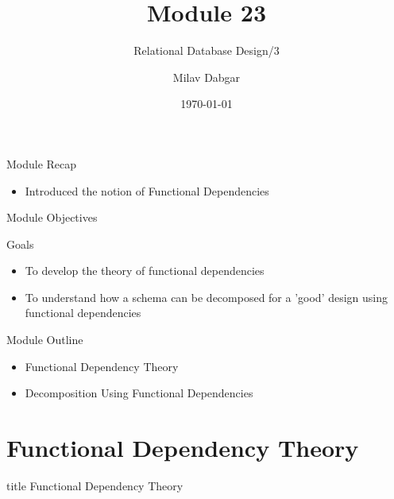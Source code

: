 \documentclass[aspectratio=169, xcolor=dvipsnames]{beamer}
\title{Module 23}
\subtitle{Relational Database Design/3}
\author{Milav Dabgar}
\institute{www.milav.in}
\date{\today}
\begin{document}
\begin{frame}
    \titlepage
\end{frame}

\begin{frame}{Module Recap}
    \begin{itemize}[<+->]
        \item Introduced the notion of Functional Dependencies
    \end{itemize}
\end{frame}

\begin{frame}{Module Objectives}
    \begin{block}{Goals}
        \begin{itemize}[<+->]
            \item To develop the theory of functional dependencies
            \item To understand how a schema can be decomposed for a 'good' design using functional dependencies
        \end{itemize}
    \end{block}
\end{frame}

\begin{frame}{Module Outline}
    \begin{itemize}[<+->]
        \item Functional Dependency Theory
        \item Decomposition Using Functional Dependencies
    \end{itemize}
\end{frame}

\section{Functional Dependency Theory}
\begin{frame}
  \vfill
  \centering
  \begin{beamercolorbox}[sep=8pt,center,shadow=true,rounded=true]{title}
    Functional Dependency Theory\par%
  \end{beamercolorbox}
  \vfill
\end{frame}
\end{document}
